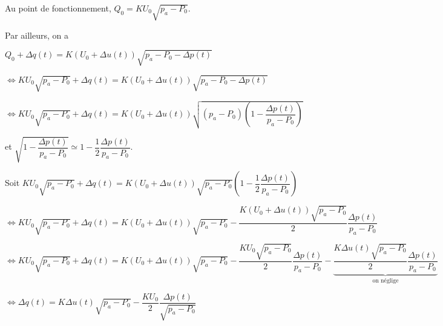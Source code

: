 \ifprof
\begin{corrige}
Au point de fonctionnement,  $Q_0 = K U_0 \sqrt{p_a- P_0}$.

Par ailleurs, on a  

$Q_0 +\Delta q(t ) = K\left( U_0 +\Delta u(t ) \right) \sqrt{p_a- P_0 - \Delta p(t )}$

$\Leftrightarrow K U_0 \sqrt{p_a- P_0}+\Delta q(t ) = K\left( U_0 +\Delta u(t ) \right) \sqrt{p_a- P_0 - \Delta p(t )}$

$\Leftrightarrow K U_0 \sqrt{p_a- P_0}+\Delta q(t ) = K\left( U_0 +\Delta u(t ) \right) \sqrt{\left(p_a- P_0\right)\left( 1- \dfrac{\Delta p(t )}{p_a- P_0}\right)}$

et $\sqrt{ 1- \dfrac{\Delta p(t )}{p_a- P_0}}\simeq 1 - \dfrac{1}{2} \dfrac{\Delta p(t )}{p_a- P_0} $.

Soit $K U_0 \sqrt{p_a- P_0}+\Delta q(t ) = K\left( U_0 +\Delta u(t ) \right) \sqrt{p_a- P_0} \left( 1 - \dfrac{1}{2} \dfrac{\Delta p(t )}{p_a- P_0} \right)$

$\Leftrightarrow K U_0 \sqrt{p_a- P_0}+\Delta q(t ) = K\left( U_0 +\Delta u(t ) \right) \sqrt{p_a- P_0} - \dfrac{K\left( U_0 +\Delta u(t ) \right) \sqrt{p_a- P_0}}{2} \dfrac{\Delta p(t )}{p_a- P_0} $


$\Leftrightarrow K U_0 \sqrt{p_a- P_0}+\Delta q(t ) = K\left( U_0 +\Delta u(t ) \right) \sqrt{p_a- P_0} 
- \dfrac{K U_0  \sqrt{p_a- P_0}}{2} \dfrac{\Delta p(t )}{p_a- P_0}
- \underbrace{\dfrac{K\Delta u(t ) \sqrt{p_a- P_0}}{2} \dfrac{\Delta p(t )}{p_a- P_0}}_{\text{on néglige}} $


$\Leftrightarrow \Delta q(t ) = K\Delta u(t )  \sqrt{p_a- P_0} 
- \dfrac{K U_0 }{2} \dfrac{\Delta p(t )}{ \sqrt{p_a- P_0}}
 $

\end{corrige}
\else
\fi

\ifprof
\begin{corrige}
\end{corrige}
\else
\fi

